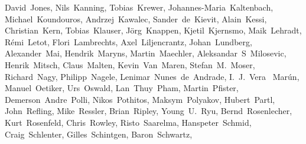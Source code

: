{David~Jones,            %
Nils~Kanning,           %
Tobias~Krewer,          %
Johannes-Maria~Kaltenbach, %
Michael~Koundouros,     %
Andrzej~Kawalec,        %
Sander~de~Kievit,       %
Alain~Kessi,            %
Christian~Kern,         %
Tobias~Klauser,		%
J\"org~Knappen,         %
Kjetil~Kjernsmo,        %
Maik~Lehradt,           %
R\'emi~Letot,           %
Flori~Lambrechts,       %
Axel~Liljencrantz,	%
Johan~Lundberg,         %
Alexander~Mai,          %
Hendrik~Maryns,         %
Martin~Maechler,        %
Aleksandar~S~Milosevic, %
Henrik~Mitsch,          %
Claus~Malten,           %
Kevin~Van~Maren,        %
Stefan~M.~Moser,        %
Richard~Nagy,           %
Philipp~Nagele,         %
Lenimar~Nunes~de~Andrade, %
I.~J.~Vera~ Mar\'un,    %
Manuel~Oetiker,         %
Urs~Oswald,             %
Lan~Thuy~Pham,          %
Martin~Pfister,		%
Demerson~Andre~Polli,   %
Nikos~Pothitos,		%
Maksym~Polyakov,        %
Hubert~Partl,           %
John~Refling,           %
Mike~Ressler,           %
Brian~Ripley,           %
Young~U.~Ryu,           %
Bernd~Rosenlecher,      %
Kurt~Rosenfeld,		%
Chris~Rowley,           %
Risto~Saarelma,         %
Hanspeter~Schmid,       %
Craig~Schlenter,        %
Gilles~Schintgen,       %
Baron~Schwartz,         %
}
